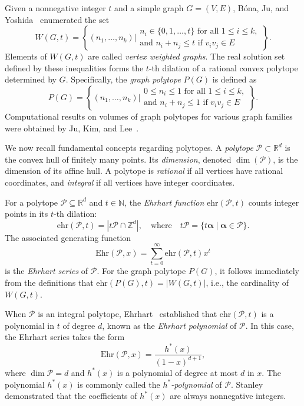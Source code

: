 \documentclass[reqno, 12pt]{amsart}
\theoremstyle{mydefinition}
\theoremstyle{myremark}
\begin{document}
Given a nonnegative integer $t$ and a simple graph $G = (V, E)$, B\'ona, Ju, and Yoshida~\cite{BonaJu07} enumerated the set
\[
W(G,t) = \left\{ (n_1,\ldots,n_k) \Big| \begin{array}{l}
n_i \in \{0,1,\ldots, t\} \text{ for all } 1 \leq i \leq k, \\
\text{and } n_i + n_j \leq t \text{ if } v_iv_j \in E
\end{array} \right\}.
\]
Elements of $W(G,t)$ are called \emph{vertex weighted graphs}. The real solution set defined by these inequalities forms the $t$-th dilation of a rational convex polytope determined by $G$. Specifically, the \emph{graph polytope} $P(G)$ is defined as
\[
P(G) = \left\{ (n_1,\ldots,n_k) \Big| \begin{array}{l}
0 \leq n_i \leq 1 \text{ for all } 1 \leq i \leq k, \\
\text{and } n_i + n_j \leq 1 \text{ if } v_iv_j \in E
\end{array} \right\}.
\]
Computational results on volumes of graph polytopes for various graph families were obtained by Ju, Kim, and Lee~\cite{JuKim18}.


We now recall fundamental concepts regarding polytopes. A \emph{polytope} $\mathcal{P} \subset \mathbb{R}^d$ is the convex hull of finitely many points. Its \emph{dimension}, denoted $\dim(\mathcal{P})$, is the dimension of its affine hull. A polytope is \emph{rational} if all vertices have rational coordinates, and \emph{integral} if all vertices have integer coordinates.


For a polytope $\mathcal{P} \subseteq \mathbb{R}^d$ and $t \in \mathbb{N}$, the \emph{Ehrhart function} $\mathrm{ehr}(\mathcal{P}, t)$ counts integer points in its $t$-th dilation:
\[
\mathrm{ehr}(\mathcal{P},t) = \left| t\mathcal{P} \cap \mathbb{Z}^d \right|, \quad \text{where} \quad t\mathcal{P} = \{ t \boldsymbol{\alpha} \mid \boldsymbol{\alpha} \in \mathcal{P} \}.
\]
The associated generating function
\[
\mathrm{Ehr}(\mathcal{P},x) = \sum_{t = 0}^{\infty} \mathrm{ehr}(\mathcal{P}, t)  x^t
\]
is the \emph{Ehrhart series} of $\mathcal{P}$. For the graph polytope $P(G)$, it follows immediately from the definitions that $\mathrm{ehr}(P(G), t) = |W(G, t)|$, i.e., the cardinality of $W(G,t)$.


When $\mathcal{P}$ is an integral polytope, Ehrhart~\cite{Ehrhart62} established that $\mathrm{ehr}(\mathcal{P},t)$ is a polynomial in $t$ of degree $d$, known as the \emph{Ehrhart polynomial} of $\mathcal{P}$. In this case, the Ehrhart series takes the form
\[
\mathrm{Ehr}(\mathcal{P},x) = \frac{h^{*}(x)}{(1-x)^{d+1}},
\]
where $\dim\mathcal{P}=d$ and $h^{*}(x)$ is a polynomial of degree at most $d$ in $x$.
The polynomial $h^{*}(x)$ is commonly called the \emph{$h^{*}$-polynomial} of $\mathcal{P}$.
Stanley~\cite{StanleyADM80} demonstrated that the coefficients of $h^{*}(x)$ are always nonnegative integers.
\end{document}

